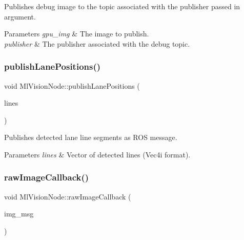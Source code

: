 Publishes debug image to the topic associated with the publisher passed in argument. 


\begin{DoxyParams}{Parameters}
{\em gpu\+\_\+img} & The image to publish. \\
\hline
{\em publisher} & The publisher associated with the debug topic. \\
\hline
\end{DoxyParams}
\mbox{\label{classMlVisionNode_a508766f7ec927847d5ce80abd9740c7c}} 
\subsubsection{\texorpdfstring{publish\+Lane\+Positions()}{publishLanePositions()}}
{\footnotesize\ttfamily void Ml\+Vision\+Node\+::publish\+Lane\+Positions (\begin{DoxyParamCaption}\item[{std\+::vector$<$ cv\+::\+Vec4i $>$ \&}]{lines }\end{DoxyParamCaption})\hspace{0.3cm}{\ttfamily [private]}}



Publishes detected lane line segments as R\+OS message. 


\begin{DoxyParams}{Parameters}
{\em lines} & Vector of detected lines (Vec4i format). \\
\hline
\end{DoxyParams}
\mbox{\label{classMlVisionNode_a1926f7a99c102f89f739240ecd44f6e7}} 
\subsubsection{\texorpdfstring{raw\+Image\+Callback()}{rawImageCallback()}}
{\footnotesize\ttfamily void Ml\+Vision\+Node\+::raw\+Image\+Callback (\begin{DoxyParamCaption}\item[{sensor\+\_\+msgs\+::msg\+::\+Image\+::\+Shared\+Ptr}]{img\+\_\+msg }\end{DoxyParamCaption})\hspace{0.3cm}{\ttfamily [private]}}



